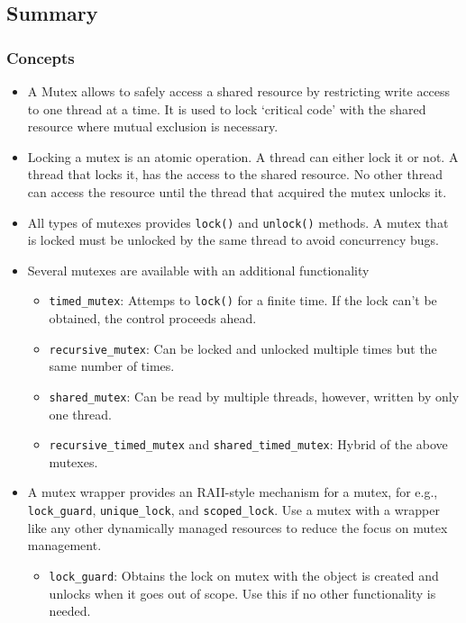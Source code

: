 \documentclass{scrartcl}
\begin{document}
\subsection{Summary}

\subsubsection{Concepts}
\begin{itemize}
\item A Mutex allows to safely access a shared resource by restricting write access to one thread at a time. It is used to lock `critical code' with the shared resource where mutual exclusion is necessary.
\item Locking a mutex is an atomic operation. A thread can either lock it or not. A thread that locks it, has the access to the shared resource. No other thread can access the resource until the thread that acquired the mutex unlocks it.
\item All types of mutexes provides \texttt{lock()} and \texttt{unlock()} methods. A mutex that is locked must be unlocked by the same thread to avoid concurrency bugs.
\item Several mutexes are available with an additional functionality 
	\begin{itemize}
	\item \texttt{timed_mutex}: Attemps to \texttt{lock()} for a finite time. If the lock can't be obtained, the control proceeds ahead.
	\item \texttt{recursive_mutex}: Can be locked and unlocked multiple times but the same number of times.
	\item \texttt{shared_mutex}: Can be read by multiple threads, however, written by only one thread.
	\item \texttt{recursive_timed_mutex} and \texttt{shared_timed_mutex}: Hybrid of the above mutexes.
	\end{itemize}
\item A mutex wrapper provides an RAII-style mechanism for a mutex, for e.g., \texttt{lock_guard}, \texttt{unique_lock}, and \texttt{scoped_lock}. Use a mutex with a wrapper like any other dynamically managed resources to reduce the focus on mutex management.
	\begin{itemize}
	\item \texttt{lock_guard}: Obtains the lock on mutex with the object is created and unlocks when it goes out of scope. Use this if no other functionality is needed.

\end{itemize}
\end{itemize}
\end{document}
